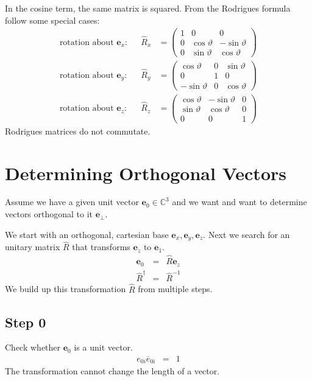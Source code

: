 \documentclass[12pt,a4paper,twoside,openright,BCOR10mm,headsepline,titlepage,abstracton,chapterprefix,final]{scrreprt}
\newcommand\Vector[1]{{\mathbf{#1}}}
\begin{document}
In the cosine term, the same matrix is squared.
From the Rodrigues formula follow some special cases:
\begin{align}
 \text{rotation about $\Vector{e}_x$:} && 
   \hat{R}_x &= 
   \begin{pmatrix}
     1 & 0 & 0 \\
     0 & \cos \vartheta & -\sin \vartheta \\
     0 & \sin \vartheta &  \cos \vartheta
   \end{pmatrix} \label{eq:rodrigues_x}
 \\
 \text{rotation about $\Vector{e}_y$:} && 
   \hat{R}_y &= 
   \begin{pmatrix}
   \cos \vartheta & 0 & \sin \vartheta \\
   0 & 1 & 0 \\
   -\sin \vartheta & 0 & \cos \vartheta
   \end{pmatrix} \label{eq:rodrigues_y}
 \\
 \text{rotation about $\Vector{e}_z$:} && 
   \hat{R}_z &= 
   \begin{pmatrix}
     \cos \vartheta & -\sin \vartheta & 0 \\
     \sin \vartheta & \cos \vartheta & 0 \\
     0 & 0 & 1
   \end{pmatrix} \label{eq:rodrigues_z}
\end{align}
Rodrigues matrices do not commutate.


\section{Determining Orthogonal Vectors} \label{sec:ortho_vectors}
Assume we have a given unit vector $\Vector{e}_0 \in \mathbb{C}^3$
and we want and want to determine vectors orthogonal to it $\Vector{e}_{\perp}$.

We start with an orthogonal, cartesian base $\Vector{e}_x, \Vector{e}_y, \Vector{e}_z$.
Next we search for an unitary matrix $\hat{R}$ that transforms $\Vector{e}_z$ to $\Vector{e}_1$.
\begin{eqnarray}
 \Vector{e}_0 &=& \hat{R} \Vector{e}_z \\
 \hat{R}^\dagger &=& \hat{R}^{-1}
\end{eqnarray}
We build up this transformation $\hat{R}$ from multiple steps.

\subsection{Step 0}
Check whether $\Vector{e}_0$ is a unit vector.
\begin{eqnarray}
 e_{0i} \overline{e}_{0i} &=& 1
\end{eqnarray}
The transformation cannot change the length of a vector.
\end{document}
